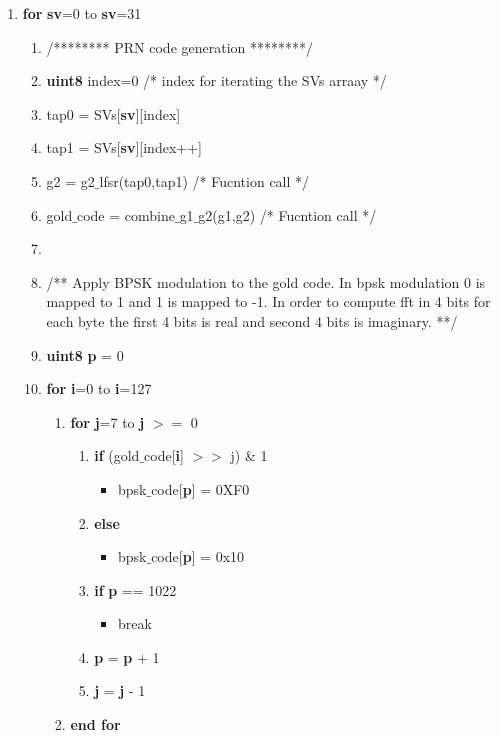 \documentclass[journal,10pt,onecolumn]{article}
\begin{document}
\begin{enumerate}
    \item \textbf{for} \textbf{sv}=0 to \textbf{sv}=31
	\begin{enumerate}
        \item[] /******** PRN code generation ********/
        \item[] \textbf{uint8} index=0    \hspace{5mm} /* index for iterating the SVs arraay */ 
        \item[] tap0 = SVs[\textbf{sv}][index]
        \item[] tap1 = SVs[\textbf{sv}][index++]
        \item[] g2 = g2$\_$lfsr(tap0,tap1)   /* Fucntion call */
        \item[] gold$\_$code = combine$\_$g1$\_$g2(g1,g2)  /* Fucntion call */
        \item[]
        \item[]  /** Apply BPSK modulation to the gold code. In bpsk modulation 0 is mapped to 1 and 1 is mapped to -1. In order to compute fft in 4 bits for each byte the first 4 bits is real and second 4 bits is imaginary. **/
        

        \item[] \textbf{uint8} \textbf{p} = 0
        \item[] \textbf{for} \textbf{i}=0 to \textbf{i}=127
        \begin{enumerate}
            \item[] \textbf{for} \textbf{j}=7 to \textbf{j} $>=$ 0
            \begin{enumerate}
                \item[] \textbf{if} (gold$\_$code[\textbf{i}] $>>$ j) \& 1
                \begin{itemize}
                    \item[] bpsk$\_$code[\textbf{p}] = 0XF0
                \end{itemize}
                \item[] \textbf{else}
                \begin{itemize}
                    \item[] bpsk$\_$code[\textbf{p}] = 0x10
                \end{itemize}
                \item[] \textbf{if} \textbf{p} == 1022
                \begin{itemize}
                    \item[] break
                \end{itemize}
                \item[] \textbf{p} = \textbf{p} + 1
                \item[] \textbf{j} = \textbf{j} - 1
            \end{enumerate}
            \item[] \textbf{end for}


\end{enumerate}
\end{enumerate}
\end{enumerate}
\end{document}
